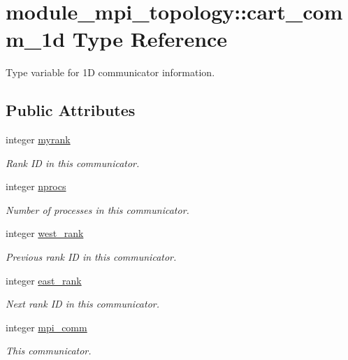 \hypertarget{structmodule__mpi__topology_1_1cart__comm__1d}{}\section{module\+\_\+mpi\+\_\+topology\+::cart\+\_\+comm\+\_\+1d Type Reference}
\label{structmodule__mpi__topology_1_1cart__comm__1d}


Type variable for 1D communicator information.  


\subsection*{Public Attributes}
\begin{DoxyCompactItemize}
\item 
integer \mbox{\hyperlink{structmodule__mpi__topology_1_1cart__comm__1d_a0a4584bb8112b6a7466400984fff8d7c}{myrank}}
\begin{DoxyCompactList}\small\item\em Rank ID in this communicator. \end{DoxyCompactList}\item 
integer \mbox{\hyperlink{structmodule__mpi__topology_1_1cart__comm__1d_aa0bb09760b4ab897a54d6b5ba8fd8eb2}{nprocs}}
\begin{DoxyCompactList}\small\item\em Number of processes in this communicator. \end{DoxyCompactList}\item 
integer \mbox{\hyperlink{structmodule__mpi__topology_1_1cart__comm__1d_a690cf0918fe88f7724bfb55c3eafbc68}{west\+\_\+rank}}
\begin{DoxyCompactList}\small\item\em Previous rank ID in this communicator. \end{DoxyCompactList}\item 
integer \mbox{\hyperlink{structmodule__mpi__topology_1_1cart__comm__1d_a80f98134dc3f4b14023b3fce5949f704}{east\+\_\+rank}}
\begin{DoxyCompactList}\small\item\em Next rank ID in this communicator. \end{DoxyCompactList}\item 
integer \mbox{\hyperlink{structmodule__mpi__topology_1_1cart__comm__1d_a4520664bb889e137887f8b36d8f35449}{mpi\+\_\+comm}}
\begin{DoxyCompactList}\small\item\em This communicator. \end{DoxyCompactList}\end{DoxyCompactItemize}



